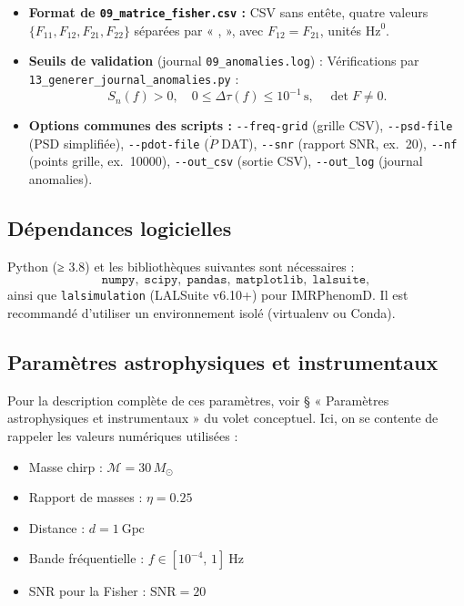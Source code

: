 \begin{itemize}
  \item \textbf{Format de \texttt{09\_matrice\_fisher.csv} :}  
    CSV sans entête, quatre valeurs \(\{F_{11},F_{12},F_{21},F_{22}\}\) séparées par « , »,  
    avec \(F_{12}=F_{21}\), unités \(\mathrm{Hz}^0\).

  \item \textbf{Seuils de validation} (journal \texttt{09\_anomalies.log}) :  
    Vérifications par \texttt{13\_generer\_journal\_anomalies.py} :
    \[
      S_{n}(f)>0,\quad
      0\le\Delta\tau(f)\le10^{-1}\,\mathrm{s},\quad
      \det F\neq0.
    \]

  \item \textbf{Options communes des scripts :}  
    \verb|--freq-grid| (grille CSV),  
    \verb|--psd-file| (PSD simplifiée),  
    \verb|--pdot-file| (\(\dot P\) DAT),  
    \verb|--snr| (rapport SNR, ex.~20),  
    \verb|--nf| (points grille, ex.~10000),  
    \verb|--out_csv| (sortie CSV),  
    \verb|--out_log| (journal anomalies).
\end{itemize}

\subsection{Dépendances logicielles}
Python (≥ 3.8) et les bibliothèques suivantes sont nécessaires :
\[
  \texttt{numpy},\;\texttt{scipy},\;\texttt{pandas},\;\texttt{matplotlib},\;\texttt{lalsuite},
\]
ainsi que \texttt{lalsimulation} (LALSuite v6.10+) pour IMRPhenomD.  
Il est recommandé d’utiliser un environnement isolé (virtualenv ou Conda).

\subsection{Paramètres astrophysiques et instrumentaux}
Pour la description complète de ces paramètres, voir § « Paramètres astrophysiques et instrumentaux » du volet conceptuel.  
Ici, on se contente de rappeler les valeurs numériques utilisées :

\begin{itemize}
  \item Masse chirp : \(\mathcal{M}=30\,M_{\odot}\)
  \item Rapport de masses : \(\eta=0.25\)
  \item Distance : \(d=1\ \mathrm{Gpc}\)
  \item Bande fréquentielle : \(f\in[10^{-4},\,1]\ \mathrm{Hz}\)
  \item SNR pour la Fisher : \(\mathrm{SNR}=20\)
\end{itemize}

